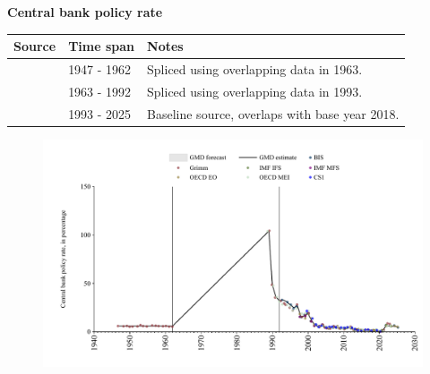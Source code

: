 \documentclass[12pt,a4paper,landscape]{article}
\begin{document}
\begin{adjustbox}{max totalsize={\paperwidth}{\paperheight},center}
\begin{minipage}[t][\textheight][t]{\textwidth}
\vspace*{0.5cm}
{}
\begin{center}
{\Large\bfseries Central bank policy rate}
\end{center}
\vspace{0.5cm}
\begin{table}[H]
\centering
\small
\begin{tabular}{|l|l|l|}
\hline
\textbf{Source} & \textbf{Time span} & \textbf{Notes} \\
\hline
\rowcolor{white}\cite{Grimm}& 1947 - 1962 &Spliced using overlapping data in 1963. \\
\rowcolor{lightgray}\cite{OECD_MEI}& 1963 - 1992 &Spliced using overlapping data in 1993. \\
\rowcolor{white}\cite{BIS}& 1993 - 2025 &Baseline source, overlaps with base year 2018. \\
\hline
\end{tabular}
\end{table}
\begin{figure}[H]
\centering
\includegraphics[width=\textwidth,height=0.6\textheight,keepaspectratio]{graphs/POL_cbrate.pdf}
\end{figure}
\end{minipage}
\end{adjustbox}
\end{document}
